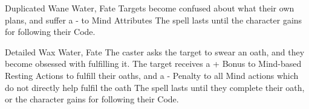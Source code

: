 \ifodd\value{diceNo}

  {Duplicated}%
  {Wane}%
  {Water, Fate}%
  {}%
  {Targets become confused about what their own plans, and suffer a - to Mind Attributes}%
  {The spell lasts until the character gains  for following their Code.}

\else

  {Detailed}%
  {Wax}%
  {Water, Fate}%
  {}%
  {The caster asks the target to swear an oath, and they become obsessed with fulfilling it.
  The target receives a + Bonus to Mind-based Resting Actions to fulfill their oaths, and a - Penalty to all Mind actions which do not directly help fulfil the oath}%
  {The spell lasts until they complete their oath, or the character gains  for following their Code.}

\fi
{}
